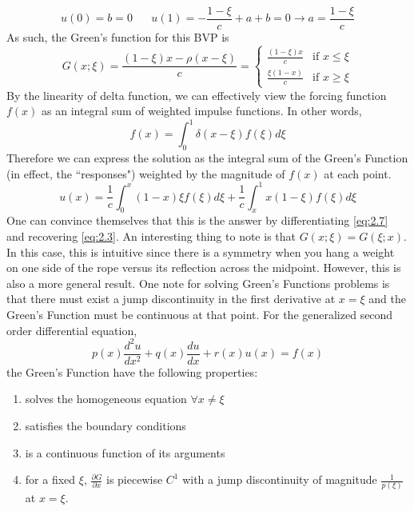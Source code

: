 \documentclass{article}
\newcommand{\pd}[2]{\frac{\partial #1}{\partial #2}}
\newcommand{\od}[2]{\frac{d #1}{d #2}}
\newcommand{\odt}[2]{\frac{d^2 #1}{d #2 ^2}}
\numberwithin{equation}{section}
\begin{document}
\begin{equation*}
    u(0)=b=0 \hspace{20pt} u(1) =-\frac{1-\xi}{c}+a+b=0 \rightarrow a=\frac{1-\xi}{c}
\end{equation*}
As such, the Green's function for this BVP is 
\begin{equation}
   G(x;\xi) = \frac{(1-\xi)x-\rho(x-\xi)}{c} = 
   \begin{cases}
       \frac{(1-\xi)x}{c} & \text{if } x\leq\xi \\
       \frac{\xi(1-x)}{c} & \text{if }x \geq \xi
   \end{cases}\label{eq:2.6}
\end{equation}
By the linearity of delta function, we can effectively view the forcing function $f(x)$ as an integral sum of weighted impulse functions. In other words,
\begin{equation*}
    f(x) = \int_0^1 \delta (x-\xi)f(\xi)d\xi
\end{equation*}
Therefore we can express the solution as the integral sum of the Green's Function (in effect, the ``responses") weighted by the magnitude of $f(x)$ at each point.
\begin{equation}
    u(x) = \frac{1}{c}\int_0^x(1-x)\xi f(\xi)d\xi + \frac{1}{c}\int_x^1 x(1-\xi)f(\xi)d\xi \label{eq:2.7}
\end{equation}
One can convince themselves that this is the answer by differentiating \eqref{eq:2.7} and recovering \eqref{eq:2.3}. An interesting thing to note is that $G(x;\xi) = G(\xi;x)$. In this case, this is intuitive since there is a symmetry when you hang a weight on one side of the rope versus its reflection across the midpoint. However, this is also a more general result. One note for solving Green's Functions problems is that there must exist a jump discontinuity in the first derivative at $x=\xi$ and the Green's Function must be continuous at that point. For the generalized second order differential equation,
\begin{equation}
    p(x)\odt{u}{x} + q(x)\od{u}{x}+r(x)u(x)=f(x) \label{eq:2.8}
\end{equation}
the Green's Function have the following properties:
\begin{enumerate}[label=\roman*)]
    \item solves the homogeneous equation $\forall x\neq\xi$
    \item satisfies the boundary conditions
    \item is a continuous function of its arguments
    \item for a fixed $\xi$, $\pd{G}{x}$ is piecewise $C^1$ with a jump discontinuity of magnitude $\frac{1}{p(\xi)}$ at $x=\xi$.
\end{enumerate}
\end{document}
